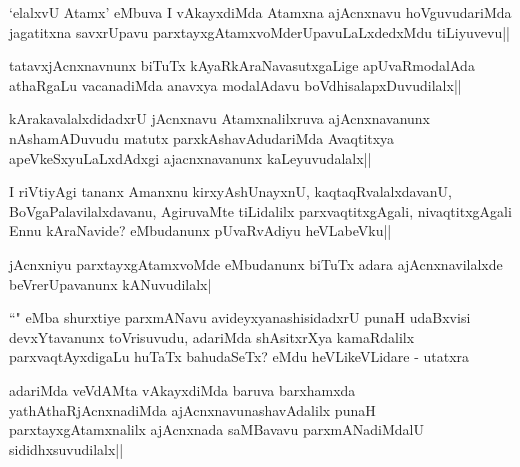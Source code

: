 \begin{artha}
`elalxvU Atamx' eMbuva I vAkayxdiMda Atamxna ajAcnxnavu hoVguvudariMda jagatitxna savxrUpavu parxtayxgAtamxvoMderUpavuLaLxdedxMdu tiLiyuvevu||
\end{artha}

\begin{artha}
tatavxjAcnxnavnunx biTuTx kAyaRkAraNavasutxgaLige apUvaRmodalAda athaRgaLu vacanadiMda anavxya modalAdavu boVdhisalapxDuvudilalx||
\end{artha}


\begin{artha}
kArakavalalxdidadxrU jAcnxnavu Atamxnalilxruva ajAcnxnavanunx nAshamADuvudu matutx parxkAshavAdudariMda Avaqtitxya apeVkeSxyuLaLxdAdxgi ajacnxnavanunx kaLeyuvudalalx||
\end{artha}


\begin{artha}
I riVtiyAgi tananx Amanxnu kirxyAshUnayxnU, kaqtaqRvalalxdavanU, BoVgaPalavilalxdavanu, AgiruvaMte tiLidalilx parxvaqtitxgAgali, nivaqtitxgAgali Ennu kAraNavide? eMbudanunx pUvaRvAdiyu heVLabeVku||
\end{artha}

\begin{artha}
jAcnxniyu parxtayxgAtamxvoMde eMbudanunx biTuTx adara ajAcnxnavilalxde beVrerUpavanunx kANuvudilalx|  
\end{artha}

\begin{artha}
``\stext" eMba shurxtiye parxmANavu avideyxyanashisidadxrU punaH udaBxvisi devxYtavanunx toVrisuvudu, adariMda shAsitxrXya kamaRdalilx parxvaqtAyxdigaLu huTaTx bahudaSeTx? eMdu heVLikeVLidare - utatxra
\end{artha}

\begin{artha}
adariMda veVdAMta vAkayxdiMda baruva barxhamxda yathAthaRjAcnxnadiMda ajAcnxnavunashavAdalilx punaH parxtayxgAtamxnalilx ajAcnxnada saMBavavu parxmANadiMdalU sididhxsuvudilalx||
\end{artha}


